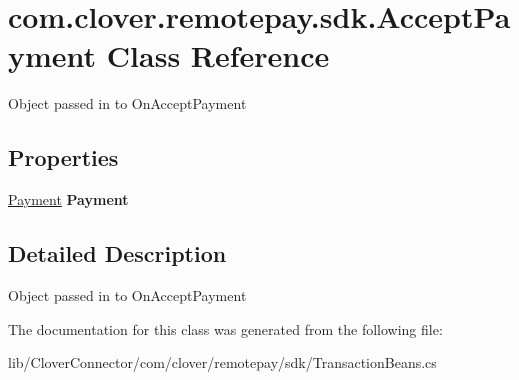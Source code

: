 \hypertarget{classcom_1_1clover_1_1remotepay_1_1sdk_1_1_accept_payment}{}\section{com.\+clover.\+remotepay.\+sdk.\+Accept\+Payment Class Reference}
\label{classcom_1_1clover_1_1remotepay_1_1sdk_1_1_accept_payment}


Object passed in to On\+Accept\+Payment  


\subsection*{Properties}
\begin{DoxyCompactItemize}
\item 
\mbox{\label{classcom_1_1clover_1_1remotepay_1_1sdk_1_1_accept_payment_a90d81e3c3167c33629bad34f90560b29}} 
\hyperlink{classcom_1_1clover_1_1sdk_1_1v3_1_1payments_1_1_payment}{Payment} {\bfseries Payment}
\end{DoxyCompactItemize}


\subsection{Detailed Description}
Object passed in to On\+Accept\+Payment 



The documentation for this class was generated from the following file\+:\begin{DoxyCompactItemize}
\item 
lib/\+Clover\+Connector/com/clover/remotepay/sdk/Transaction\+Beans.\+cs\end{DoxyCompactItemize}
